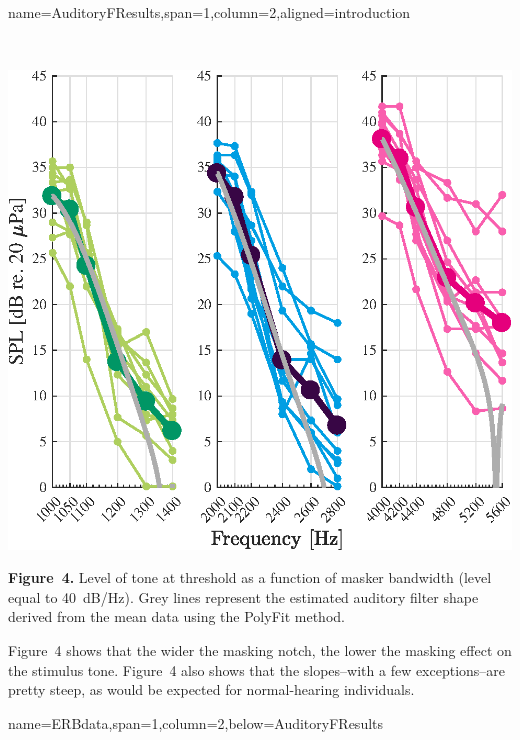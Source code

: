 \documentclass[paperwidth=100cm,paperheight=160cm,portrait,fontscale=0.2941]{baposter}
\begin{document}
\begin{poster}
{name=AuditoryFResults,span=1,column=2,aligned=introduction}
{\parskip 5pt


~
\begin{flushright}
\includegraphics[width=0.95\linewidth]{pos_all_AF.eps}
\end{flushright}
\vspace{-2.7pt}

\textbf{Figure~4.} Level of tone at threshold as a function of masker bandwidth (level equal to 40~dB/Hz). Grey lines represent the estimated auditory filter shape derived from the mean data using the PolyFit method.


Figure~4 shows that the wider the masking notch, the lower the masking effect on the stimulus tone. Figure~4 also shows that the slopes--with a few exceptions--are pretty steep, as would be expected for normal-hearing individuals.

}


{name=ERBdata,span=1,column=2,below=AuditoryFResults}
{\parskip 5pt

~

}
\end{poster}
\end{document}

